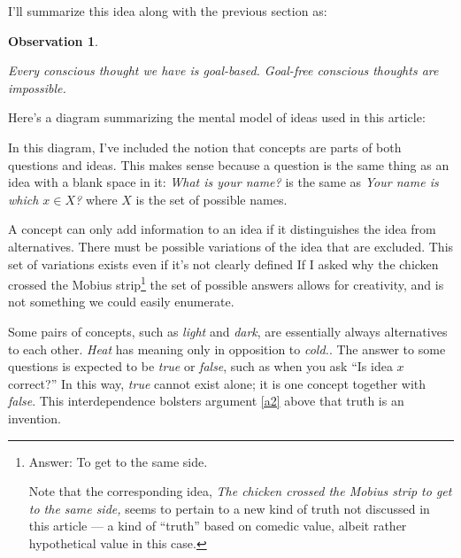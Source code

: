 \documentclass[11pt, oneside]{article}   	%
\newtheorem{obs}{Observation}
\begin{document}

I'll summarize this idea along with the previous section as:
\newcommand{\obsfour}{
    Every conscious thought we have is goal-based.
    Goal-free conscious thoughts are impossible.
}
\begin{obs}\label{o4}
    \obsfour
\end{obs}

Here's a diagram summarizing the mental model of ideas used in this
article:

\begin{center}
%
\end{center}

In this diagram, I've included the notion that concepts are parts of both
questions and ideas.
This makes sense because a question is the same thing as an idea
with a blank space in it: {\em What is your name?} is the same as
{\em Your name is which $x\in X$?} where $X$ is the set of possible names.

A concept can only add information to an idea if it distinguishes the idea
from alternatives.
There must be possible variations of the idea that are excluded.
This set of variations exists even if it's not clearly defined
If I asked why the chicken crossed the Mobius strip\footnote{Answer: To
get to the same side.\par Note that the corresponding idea, {\em The chicken
crossed the Mobius strip to get to the same side,} seems to pertain to a new
kind of truth not discussed in this article ---
a kind of ``truth'' based on comedic
value, albeit rather hypothetical value in this case.}
the set of possible answers allows for creativity, and is not something we could
easily enumerate.

Some pairs of concepts, such as {\em light} and {\em dark}, are essentially
always alternatives to each other.
{\em Heat} has meaning only in opposition to {\em cold.}.
The answer to some questions is expected to be {\em true} or {\em false},
such as when you ask ``Is idea $x$ correct?''
In this way, {\em true} cannot exist alone; it is one concept
together with {\em false}.
This interdependence bolsters argument \ref{a2} above that truth is
an invention.
\end{document}
